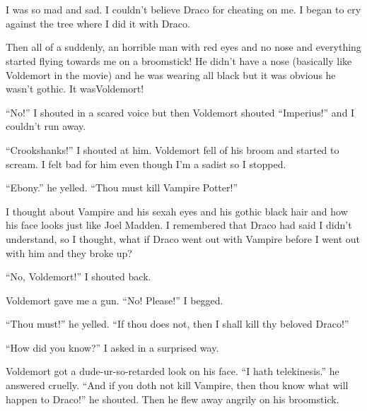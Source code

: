 \section{}



I was so mad and sad. I couldn't believe Draco for cheating on me. I began to cry against the tree where I did it with Draco.

Then all of a suddenly, an horrible man with red eyes and no nose and everything started flying towards me on a broomstick! He didn't have a nose (basically like Voldemort in the movie) and he was wearing all black but it was obvious he wasn't gothic. It was\dotfill Voldemort!

\begin{sloppypar}
    \enquote{No!} I shouted in a scared voice but then Voldemort shouted \enquote{Imperius!} and I couldn't run away.
\end{sloppypar}

\enquote{Crookshanks!} I shouted at him. Voldemort fell of his broom and started to scream. I felt bad for him even though I'm a sadist so I stopped.

\enquote{Ebony.} he yelled. \enquote{Thou must kill Vampire Potter!}

\begin{sloppypar}
    I thought about Vampire and his sexah eyes and his gothic black hair and how his face looks just like Joel Madden. I remembered that Draco had said I didn't understand, so I thought, what if Draco went out with Vampire before I went out with him and they broke up?
\end{sloppypar}

\enquote{No, Voldemort!} I shouted back.

Voldemort gave me a gun. \enquote{No! Please!} I begged.

\enquote{Thou must!} he yelled. \enquote{If thou does not, then I shall kill thy beloved Draco!}

\enquote{How did you know?} I asked in a surprised way.

Voldemort got a dude-ur-so-retarded look on his face. \enquote{I hath telekinesis.} he answered cruelly. \enquote{And if you doth not kill Vampire, then thou know what will happen to Draco!} he shouted. Then he flew away angrily on his broomstick.

